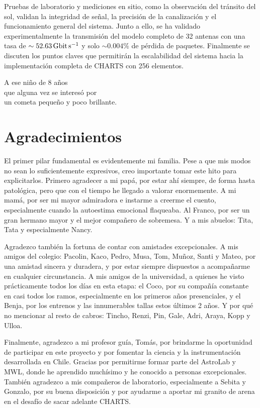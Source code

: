 \documentclass[
	12pt,
	letterpaper,
  oneside
  ]{book}
\makeatletter
\newenvironment{preliminary}{
  \pagestyle{plain}\pagenumbering{roman}
  }{\cleardoublepage\pagenumbering{arabic}}
\newenvironment{dedication}{
  \if@openright\cleardoublepage\else\clearpage\fi
  \vspace*{\stretch{1}}
  \itshape
  \raggedleft
  \begingroup
  }{\par\vspace{\stretch{3}}\endgroup\newpage}
\newenvironment{acknowledgements}{
  \if@openright\cleardoublepage\else\clearpage\fi
  \chapter*{Agradecimientos}
  \begingroup
  }{\par\endgroup\newpage}
\makeatother
\begin{document}
\begin{preliminary}
  Pruebas de laboratorio y mediciones en sitio, como la observación del tránsito del sol, validan la integridad de señal, la precisión de la canalización y el funcionamiento general del sistema. Junto a ello, se ha validado experimentalmente la transmisión del modelo completo de \num{32} antenas con una tasa de $\sim\qty{52.63}{\giga\bit\per\second}$ y solo $\sim0.004\%$ de pérdida de paquetes. Finalmente se discuten los puntos claves que permitirán la escalabilidad del sistema hacia la implementación completa de CHARTS con 256 elementos.
  \newpage

  \begin{dedication}
     A ese niño de 8 años \\
     que alguna vez se interesó por \\ 
     un cometa pequeño y poco brillante.
  \end{dedication}

  \newpage

  

  \begin{acknowledgements}
    El primer pilar fundamental es evidentemente mi familia. Pese a que mis modos no sean lo suficientemente expresivos, creo importante tomar este hito para explicitarlos. Primero agradecer a mi papá, por estar ahí siempre, de forma hasta patológica, pero que con el tiempo he llegado a valorar enormemente. A mi mamá, por ser mi mayor admiradora e instarme a creerme el cuento, especialmente cuando la autoestima emocional flaqueaba. Al Franco, por ser un gran hermano mayor y el mejor compañero de sobremesa. Y a mis abuelos: Tita, Tata y especialmente Nancy. 

    Agradezco también la fortuna de contar con amistades excepcionales. A mis amigos del colegio: Pacolin, Kaco, Pedro, Musa, Tom, Muñoz, Santi y Mateo, por una amistad sincera y duradera, y por estar siempre dispuestos a acompañarme en cualquier circunstancia. A mis amigos de la universidad, a quienes he visto prácticamente todos los días en esta etapa: el Coco, por su compañía constante en casi todos los ramos, especialmente en los primeros años presenciales, y el Benja, por los entrenos y las innumerables tallas estos últimos 2 años. Y por qué no mencionar al resto de cabros: Tincho, Renzi, Pin, Gale, Adri, Araya, Kopp y Ulloa.

    Finalmente, agradezco a mi profesor guía, Tomás, por brindarme la oportunidad de participar en este proyecto y por fomentar la ciencia y la instrumentación desarrollada en Chile. Gracias por permitirme formar parte del AstroLab y MWL, donde he aprendido muchísimo y he conocido a personas excepcionales. También agradezco a mis compañeros de laboratorio, especialmente a Sebita y Gonzalo, por su buena disposición y por ayudarme a aportar mi granito de arena en el desafío de sacar adelante CHARTS.
  \end{acknowledgements}


\end{preliminary}
\end{document}

